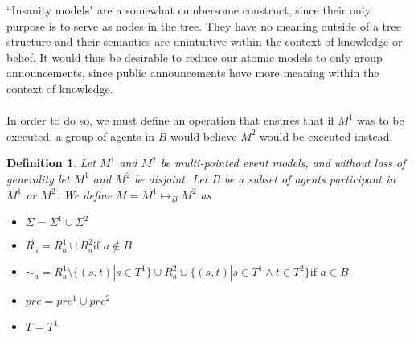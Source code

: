 \documentclass[12pt, a4paper, titlepage]{scrartcl}
\newtheorem{defn}{Definition}[subsection]
\numberwithin{equation}{section}
\begin{document}
``Insanity models" are a somewhat cumbersome construct, since their only purpose
is to serve as nodes in the tree.
They have no meaning outside of a tree structure and their semantics are
unintuitive within the context of knowledge or belief.
It would thus be desirable to reduce our atomic models to only group
announcements, since public announcements have more meaning within the context of
knowledge.\\
\\
In order to do so, we must define an operation that ensures that if $M^1$ was to
be executed, a group of agents in $B$ would believe $M^2$ would be executed
instead.
\begin{defn} \label{possTwo}
Let $M^1$ and $M^2$ be multi-pointed event models, and without loss of
generality let $M^1$ and $M^2$ be disjoint.
Let $B$ be a subset of agents participant in $M^1$ or $M^2$.
We define $M = M^1 \mapsto_B M^2$ as 
\begin{itemize}
  \item $\Sigma = \Sigma^1 \cup \Sigma^2$
  \item $R_a =
    R^1_a \cup R^2_a \text{if } a \notin B$
	\item $\sim_a =
      R^1_a \setminus \{(s,t) | s \in T^1 \} \cup
      R^2_a \cup
      \{(s,t) | s \in T^1 \land t \in T^2 \}
    \text{if } a \in B$
  \item $pre = pre^1 \cup pre^2$
  \item $T = T^1$
\end{itemize}
\end{defn}
\end{document}
